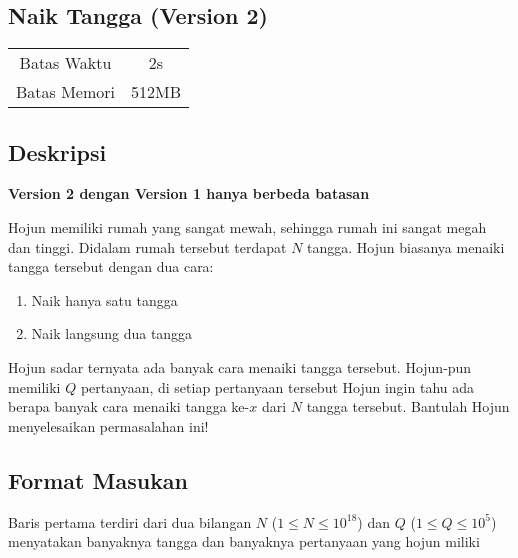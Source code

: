 \documentclass{article}
\begin{document}
\begin{center}
    \section*{Naik Tangga (Version 2)} %

    \begin{tabular}{ | c c | }
        \hline
        Batas Waktu  & 2s \\    %
        Batas Memori & 512MB \\  %
        \hline
    \end{tabular}
\end{center}

\subsection*{Deskripsi}
\vspace{-\baselineskip}
\begin{center}
	\textbf{Version 2 dengan Version 1 hanya berbeda batasan}
\end{center}
\vspace{-\baselineskip}
Hojun memiliki rumah yang sangat mewah, sehingga rumah ini sangat megah dan tinggi. Didalam rumah tersebut terdapat $N$ tangga. Hojun biasanya menaiki tangga tersebut dengan dua cara:
\vspace{-\baselineskip}
\begin{enumerate}
    \setlength\itemsep{0pt}
    \item Naik hanya satu tangga
    \item Naik langsung dua tangga
\end{enumerate}
\vspace{-\baselineskip}
Hojun sadar ternyata ada banyak cara menaiki tangga tersebut. Hojun-pun memiliki $Q$ pertanyaan, di setiap pertanyaan tersebut Hojun ingin tahu ada berapa banyak cara menaiki tangga ke-$x$ dari $N$ tangga tersebut. Bantulah Hojun menyelesaikan permasalahan ini!

\subsection*{Format Masukan}

Baris pertama terdiri dari dua bilangan $N$ ($1 \leq N \leq 10^{18}$) dan $Q$ ($1 \leq Q \leq 10^5$) menyatakan banyaknya tangga dan banyaknya pertanyaan yang hojun miliki
\end{document}
